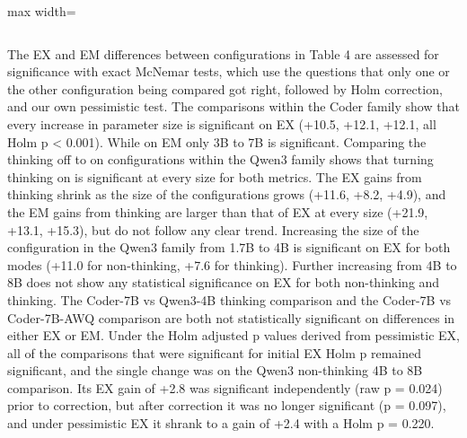 \begin{table}[!htbp]
\begin{adjustbox}{max width=\linewidth}
\begin{tabular}{@{}lccccc@{}}
\bottomrule
\end{tabular}
\end{adjustbox}
\par{}
\end{table}

The EX and EM differences between configurations in Table 4 are assessed for significance with exact McNemar tests, which use the questions that only one or the other configuration being compared got right, followed by Holm correction, and our own pessimistic test. The comparisons within the Coder family show that every increase in parameter size is significant on EX (+10.5, +12.1, +12.1, all Holm p \textless{} 0.001). While on EM only 3B to 7B is significant. Comparing the thinking off to on configurations within the Qwen3 family shows that turning thinking on is significant at every size for both metrics. The EX gains from thinking shrink as the size of the configurations grows (+11.6, +8.2, +4.9), and the EM gains from thinking are larger than that of EX at every size (+21.9, +13.1, +15.3), but do not follow any clear trend. Increasing the size of the configuration in the Qwen3 family from 1.7B to 4B is significant on EX for both modes (+11.0 for non-thinking, +7.6 for thinking). Further increasing from 4B to 8B does not show any statistical significance on EX for both non-thinking and thinking. The Coder-7B vs Qwen3-4B thinking comparison and the Coder-7B vs Coder-7B-AWQ comparison are both not statistically significant on differences in either EX or EM. Under the Holm adjusted p values derived from pessimistic EX, all of the comparisons that were significant for initial EX Holm p remained significant, and the single change was on the Qwen3 non-thinking 4B to 8B comparison. Its EX gain of +2.8 was significant independently (raw p = 0.024) prior to correction, but after correction it was no longer significant (p = 0.097), and under pessimistic EX it shrank to a gain of +2.4 with a Holm p = 0.220.

